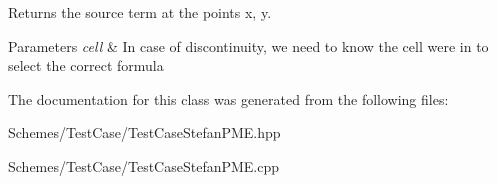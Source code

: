 Returns the source term at the points x, y. 


\begin{DoxyParams}{Parameters}
{\em cell} & In case of discontinuity, we need to know the cell we\textquotesingle{}re in to select the correct formula \\
\hline
\end{DoxyParams}


The documentation for this class was generated from the following files\+:\begin{DoxyCompactItemize}
\item 
Schemes/\+Test\+Case/Test\+Case\+Stefan\+P\+M\+E.\+hpp\item 
Schemes/\+Test\+Case/Test\+Case\+Stefan\+P\+M\+E.\+cpp\end{DoxyCompactItemize}
